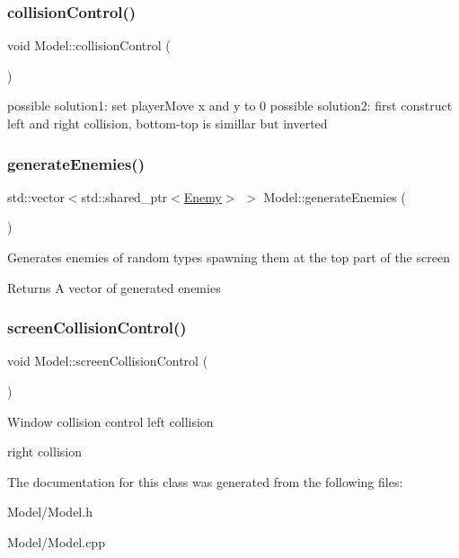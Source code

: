 \subsubsection{\texorpdfstring{collision\+Control()}{collisionControl()}}
{\footnotesize\ttfamily void Model\+::collision\+Control (\begin{DoxyParamCaption}{ }\end{DoxyParamCaption})\hspace{0.3cm}{\ttfamily [inline]}}

possible solution1\+: set player\+Move x and y to 0 possible solution2\+: first construct left and right collision, bottom-\/top is simillar but inverted \mbox{\label{class_model_a37263d57b165877f36157a9538c0b96b}} 
\subsubsection{\texorpdfstring{generate\+Enemies()}{generateEnemies()}}
{\footnotesize\ttfamily std\+::vector$<$std\+::shared\+\_\+ptr$<$\hyperlink{class_enemy}{Enemy}$>$ $>$ Model\+::generate\+Enemies (\begin{DoxyParamCaption}{ }\end{DoxyParamCaption})\hspace{0.3cm}{\ttfamily [inline]}}

Generates enemies of random types spawning them at the top part of the screen \begin{DoxyReturn}{Returns}
A vector of generated enemies 
\end{DoxyReturn}
\mbox{\label{class_model_a342131d5e48ed3ab8d59f9b19c7f759a}} 
\subsubsection{\texorpdfstring{screen\+Collision\+Control()}{screenCollisionControl()}}
{\footnotesize\ttfamily void Model\+::screen\+Collision\+Control (\begin{DoxyParamCaption}{ }\end{DoxyParamCaption})\hspace{0.3cm}{\ttfamily [inline]}}

Window collision control left collision

right collision 

The documentation for this class was generated from the following files\+:\begin{DoxyCompactItemize}
\item 
Model/Model.\+h\item 
Model/Model.\+cpp\end{DoxyCompactItemize}
